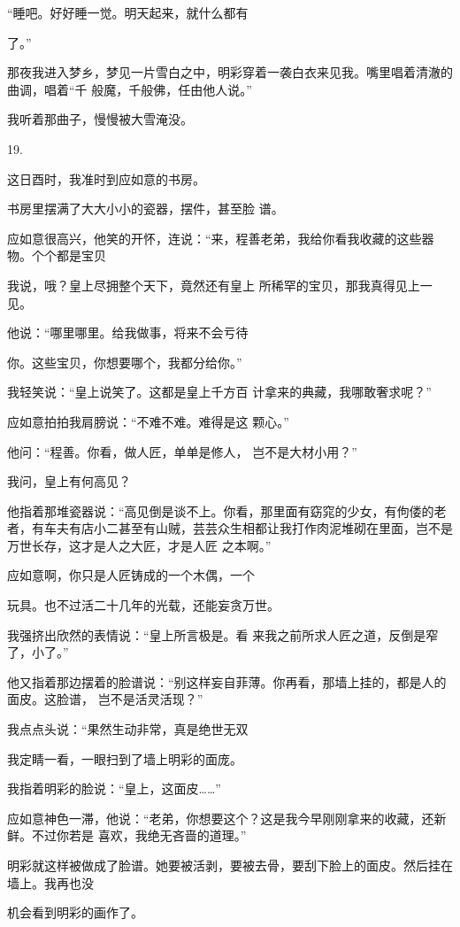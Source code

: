 \documentclass{article}
\begin{document}
“睡吧。好好睡一觉。明天起来，就什么都有

\newpage
了。” 

那夜我进入梦乡，梦见一片雪白之中，明彩穿着一袭白衣来见我。嘴里唱着清澈的曲调，唱着“千
般魔，千般佛，任由他人说。” 


我听着那曲子，慢慢被大雪淹没。 


19. 


这日酉时，我准时到应如意的书房。 

书房里摆满了大大小小的瓷器，摆件，甚至脸
谱。 

应如意很高兴，他笑的开怀，连说：“来，程善老弟，我给你看我收藏的这些器物。个个都是宝贝

我说，哦？皇上尽拥整个天下，竟然还有皇上
所稀罕的宝贝，那我真得见上一见。 

他说：“哪里哪里。给我做事，将来不会亏待
\newpage

你。这些宝贝，你想要哪个，我都分给你。” 

我轻笑说：“皇上说笑了。这都是皇上千方百
计拿来的典藏，我哪敢奢求呢？” 

应如意拍拍我肩膀说：“不难不难。难得是这
颗心。” 

他问：“程善。你看，做人匠，单单是修人，
岂不是大材小用？” 


我问，皇上有何高见？ 

他指着那堆瓷器说：“高见倒是谈不上。你看，那里面有窈窕的少女，有佝偻的老者，有车夫有店小二甚至有山贼，芸芸众生相都让我打作肉泥堆砌在里面，岂不是万世长存，这才是人之大匠，才是人匠
之本啊。” 

应如意啊，你只是人匠铸成的一个木偶，一个

\newpage
玩具。也不过活二十几年的光载，还能妄贪万世。 

我强挤出欣然的表情说：“皇上所言极是。看
来我之前所求人匠之道，反倒是窄了，小了。” 

他又指着那边摆着的脸谱说：“别这样妄自菲薄。你再看，那墙上挂的，都是人的面皮。这脸谱，
岂不是活灵活现？” 

我点点头说：“果然生动非常，真是绝世无双


我定睛一看，一眼扫到了墙上明彩的面庞。 


我指着明彩的脸说：“皇上，这面皮……” 

应如意神色一滞，他说：“老弟，你想要这个？这是我今早刚刚拿来的收藏，还新鲜。不过你若是
喜欢，我绝无吝啬的道理。” 

明彩就这样被做成了脸谱。她要被活剥，要被去骨，要刮下脸上的面皮。然后挂在墙上。我再也没

\newpage
机会看到明彩的画作了。 
\end{document}
